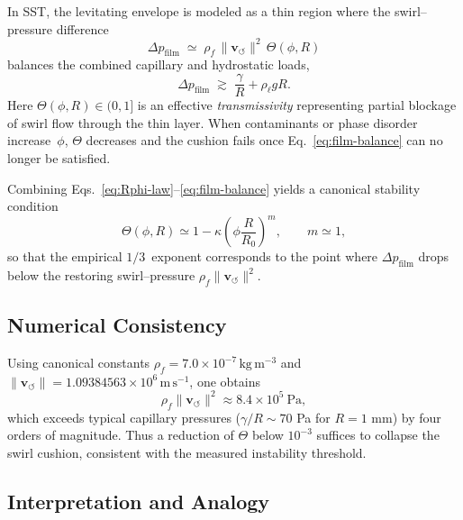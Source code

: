 \documentclass[10pt,reprint,aps,onecolumn,nofootinbib]{revtex4-2}
\begin{document}
    In SST, the levitating envelope is modeled as a thin region where the
    swirl--pressure difference
    \begin{equation}
    \Delta p_{\mathrm{film}}
    \;\simeq\;
    \rho_{\!f}\,
    \lVert \mathbf{v}_{\!\boldsymbol{\circlearrowleft}}\rVert^{2}\,
    \Theta(\phi,R)
    \label{eq:film-pressure}
    \end{equation}
    balances the combined capillary and hydrostatic loads,
    \begin{equation}
    \Delta p_{\mathrm{film}}
    \;\gtrsim\;
    \frac{\gamma}{R} + \rho_{\ell} g R.
    \label{eq:film-balance}
    \end{equation}
    Here $\Theta(\phi,R)\!\in\!(0,1]$ is an effective \emph{transmissivity}
    representing partial blockage of swirl flow through the thin layer.
    When contaminants or phase disorder increase~$\phi$, $\Theta$ decreases
    and the cushion fails once Eq.~\eqref{eq:film-balance} can no longer be
    satisfied.

    Combining Eqs.~\eqref{eq:Rphi-law}--\eqref{eq:film-balance} yields
    a canonical stability condition
    \begin{equation}
    \Theta(\phi,R)
    \simeq
    1 - \kappa \!\left(
    \phi \frac{R}{R_0}
    \right)^{\!m},
    \qquad
    m\simeq 1,
    \end{equation}
    so that the empirical $1/3$~exponent corresponds to the point where
    $\Delta p_{\mathrm{film}}$ drops below the restoring
    swirl--pressure $\rho_{\!f}\lVert\mathbf{v}_{\!\boldsymbol{\circlearrowleft}}\rVert^{2}$.

    \subsection{Numerical Consistency}

    Using canonical constants
    $\rho_{\!f}=7.0\times10^{-7}\,\mathrm{kg\,m^{-3}}$
    and
    $\lVert\mathbf{v}_{\!\boldsymbol{\circlearrowleft}}\rVert
    =1.09384563\times10^{6}\,\mathrm{m\,s^{-1}}$,
    one obtains
    \[
    \rho_{\!f}\lVert\mathbf{v}_{\!\boldsymbol{\circlearrowleft}}\rVert^{2}
    \approx 8.4\times10^{5}\ \mathrm{Pa},
    \]
    which exceeds typical capillary pressures
    ($\gamma/R\!\sim\!70$ Pa for $R=1$ mm) by four orders of magnitude.
    Thus a reduction of $\Theta$ below $10^{-3}$ suffices to collapse the
    swirl cushion, consistent with the measured instability threshold.

    \subsection{Interpretation and Analogy}
\end{document}
